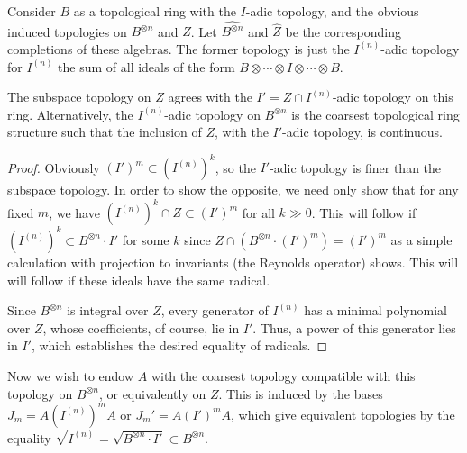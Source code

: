 Consider $B$ as a
topological ring with the $I$-adic topology, and the obvious induced
topologies on $B^{\otimes n}$ and $Z$. Let $\widehat{B^{\otimes n}}$
and $\widehat{Z}$ be the corresponding completions of these algebras.
The former topology is just
the $I^{(n)}$-adic topology for $I^{(n)}$ the sum of all ideals of the
form $B\otimes \cdots \otimes I\otimes \cdots \otimes B$.
\begin{lemma}
 The subspace topology on $Z$ agrees with the 
 $I'=Z\cap I^{(n)}$-adic topology on this ring. Alternatively, the
 $I^{(n)}$-adic topology on $B^{\otimes n}$ is the coarsest
 topological ring structure
 such that the inclusion of $Z$, with the $I'$-adic topology, is continuous.
\end{lemma}
\begin{proof}
 Obviously $ (I')^m\subset (I^{(n)})^k$, so the $I'$-adic topology is
 finer than the subspace topology. In order to show the opposite, we need only show that for any fixed $m$, we have
 $(I^{(n)})^k\cap Z\subset (I')^m$ for all $k\gg 0$. This will
 follow if $(I^{(n)})^k\subset B^{\otimes n}\cdot I'$ for some $k$
 since $Z\cap(B^{\otimes n}\cdot (I')^m)=(I')^m$ as a simple
 calculation with projection to invariants (\ie the Reynolds
 operator) shows. This will
 will follow if these ideals have the same radical.

 Since $B^{\otimes n}$ is integral over $Z$, every generator of $
 I^{(n)}$ has a minimal polynomial over $Z$, whose coefficients, of
 course, lie in $I'$. Thus, a power of this generator lies in $I'$,
 which establishes the desired equality of radicals. 
\end{proof}
 Now we wish to endow $A$ with the coarsest topology compatible with
 this topology on $B^{\otimes n}$, or equivalently on $Z$. This is induced by the bases $J_m=A (I^{(n)})^m
 A$ or $J_m'=A (I')^mA$, which give equivalent topologies by the
 equality $\sqrt{I^{(n)}}=\sqrt{B^{\otimes n}\cdot I'}\subset
 B^{\otimes n}$.

